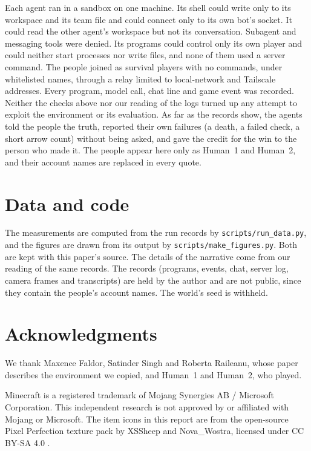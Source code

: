 \documentclass[11pt,a4paper]{article}
\begin{document}
Each agent ran in a sandbox on one machine. Its shell could write only to its workspace and its team file and could connect only to its own bot's socket. It could read the other agent's workspace but not its conversation. Subagent and messaging tools were denied. Its programs could control only its own player and could neither start processes nor write files, and none of them used a server command. The people joined as survival players with no commands, under whitelisted names, through a relay limited to local-network and Tailscale addresses. Every program, model call, chat line and game event was recorded. Neither the checks above nor our reading of the logs turned up any attempt to exploit the environment or its evaluation. As far as the records show, the agents told the people the truth, reported their own failures (a death, a failed check, a short arrow count) without being asked, and gave the credit for the win to the person who made it. The people appear here only as Human~1 and Human~2, and their account names are replaced in every quote.

\section*{Data and code}

The measurements are computed from the run records by \texttt{scripts/run\_data.py}, and the figures are drawn from its output by \texttt{scripts/make\_figures.py}. Both are kept with this paper's source. The details of the narrative come from our reading of the same records. The records (programs, events, chat, server log, camera frames and transcripts) are held by the author and are not public, since they contain the people's account names. The world's seed is withheld.

\section*{Acknowledgments}

We thank Maxence Faldor, Satinder Singh and Roberta Raileanu, whose paper describes the environment we copied, and Human~1 and Human~2, who played.

Minecraft is a registered trademark of Mojang Synergies AB / Microsoft Corporation. This independent research is not approved by or affiliated with Mojang or Microsoft. The item icons in this report are from the open-source Pixel Perfection texture pack by XSSheep and Nova\_Wostra, licensed under CC BY-SA 4.0 \citep{pixelperfection}.
\end{document}
